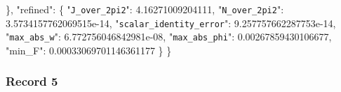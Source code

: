 \documentclass[
  10pt,
]{article}
\newenvironment{Shaded}{}{}
\newcommand{\DataTypeTok}[1]{\textcolor[rgb]{0.56,0.13,0.00}{#1}}
\newcommand{\FloatTok}[1]{\textcolor[rgb]{0.25,0.63,0.44}{#1}}
\newcommand{\FunctionTok}[1]{\textcolor[rgb]{0.02,0.16,0.49}{#1}}
\begin{document}
\begin{Shaded}
\begin{Highlighting}[]
  \FunctionTok{\},}
  \DataTypeTok{"refined"}\FunctionTok{:} \FunctionTok{\{}
    \DataTypeTok{"\nolinkurl{J_over_2pi2}"}\FunctionTok{:} \FloatTok{4.16271009204111}\FunctionTok{,}
    \DataTypeTok{"\nolinkurl{N_over_2pi2}"}\FunctionTok{:} \FloatTok{3.5734157762069515e{-}14}\FunctionTok{,}
    \DataTypeTok{"\nolinkurl{scalar_identity_error}"}\FunctionTok{:} \FloatTok{9.257757662287753e{-}14}\FunctionTok{,}
    \DataTypeTok{"\nolinkurl{max_abs_w}"}\FunctionTok{:} \FloatTok{6.772756046842981e{-}08}\FunctionTok{,}
    \DataTypeTok{"\nolinkurl{max_abs_phi}"}\FunctionTok{:} \FloatTok{0.00267859430106677}\FunctionTok{,}
    \DataTypeTok{"min\_F"}\FunctionTok{:} \FloatTok{0.00033069701146361177}
  \FunctionTok{\}}
\FunctionTok{\}}
\end{Highlighting}
\end{Shaded}

\hypertarget{record-5}{%
\subsubsection{Record 5}\label{record-5}}
\end{document}
